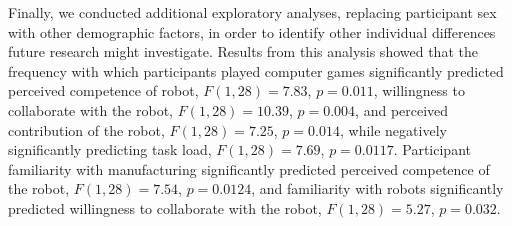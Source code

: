 Finally, we conducted additional exploratory analyses, replacing participant sex with other demographic factors, in order to identify other individual differences future research might investigate. Results from this analysis showed that the frequency with which participants played computer games significantly predicted perceived competence of robot, $F(1,28) = 7.83$, $p = 0.011$, willingness to collaborate with the robot, $F(1,28) = 10.39$, $p = 0.004$, and perceived contribution of the robot, $F(1,28) = 7.25$, $p = 0.014$, while negatively significantly predicting task load, $F(1,28) = 7.69$, $p = 0.0117$. Participant familiarity with manufacturing significantly predicted perceived competence of the robot, $F(1,28) = 7.54$, $p = 0.0124$, and familiarity with robots significantly predicted willingness to collaborate with the robot, $F(1,28) = 5.27$, $p = 0.032$.